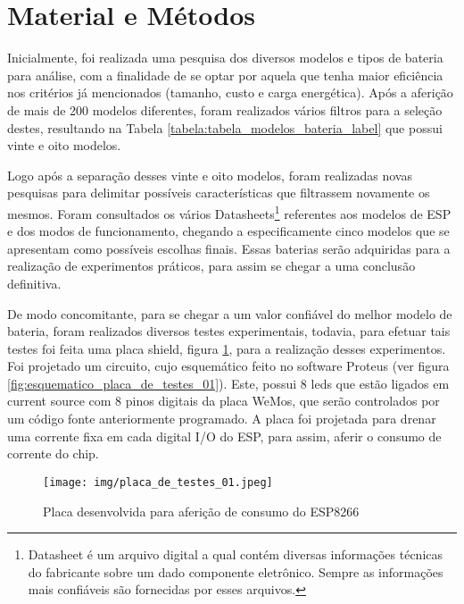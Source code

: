 \newpage
\section{Material e Métodos}
\label{sc:metodologia_}



{
Inicialmente, foi realizada uma pesquisa dos diversos modelos e tipos de bateria para análise, com a finalidade de se optar por aquela que tenha maior eficiência nos critérios já mencionados (tamanho, custo e carga energética). Após a aferição de mais de 200 modelos diferentes, foram realizados vários filtros para a seleção destes, resultando na Tabela \ref{tabela:tabela_modelos_bateria_label} que possui vinte e oito modelos.
}



{
Logo após a separação desses vinte e oito modelos, foram realizadas novas pesquisas para delimitar possíveis características que filtrassem novamente os mesmos. Foram consultados os vários Datasheets\footnote{Datasheet é um arquivo digital a qual contém diversas informações técnicas do fabricante sobre um dado componente eletrônico. Sempre as informações mais confiáveis são fornecidas por esses arquivos.} referentes aos modelos de ESP e dos modos de funcionamento, chegando a especificamente cinco modelos que se apresentam como possíveis escolhas finais. Essas baterias serão adquiridas para a realização de experimentos práticos, para assim se chegar a uma conclusão definitiva.
}

{
De modo concomitante, para se chegar a um valor confiável do melhor modelo de bateria, foram realizados diversos testes experimentais, todavia, para efetuar tais testes foi feita uma placa shield, figura \ref{fig:placa_de_testes_01}, para a realização desses experimentos. Foi projetado um circuito, cujo esquemático feito no software Proteus (ver figura \ref{fig:esquematico_placa_de_testes_01}). Este, possui 8 leds que estão ligados em current source com 8 pinos digitais da placa WeMos, que serão controlados por um código fonte anteriormente programado. A placa foi projetada para drenar uma corrente fixa em cada digital I/O do ESP, para assim, aferir o consumo de corrente do chip.
}

\begin{figure}[H]
    \centering
    \texttt{[image: img/placa\_de\_testes\_01.jpeg]}
    \caption{Placa desenvolvida para aferição de consumo do ESP8266}
    \label{fig:placa_de_testes_01}
\end{figure}

